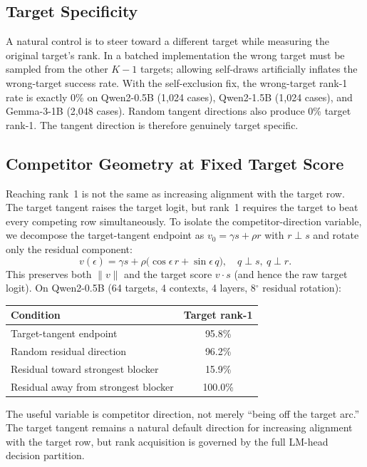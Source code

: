 \documentclass{article}
\begin{document}
\subsection{Target Specificity}

A natural control is to steer toward a different target while measuring the
original target's rank. In a batched implementation the wrong target must be
sampled from the other $K-1$ targets; allowing self-draws artificially inflates
the wrong-target success rate. With the self-exclusion fix, the wrong-target
rank-1 rate is exactly 0\% on Qwen2-0.5B (1,024 cases), Qwen2-1.5B (1,024
cases), and Gemma-3-1B (2,048 cases). Random tangent directions also produce 0\%
target rank-1. The tangent direction is therefore genuinely target specific.

\subsection{Competitor Geometry at Fixed Target Score}

Reaching rank~1 is not the same as increasing alignment with the target row.
The target tangent raises the target logit, but rank~1 requires the target to
beat every competing row simultaneously. To isolate the competitor-direction
variable, we decompose the target-tangent endpoint as $v_0 = \gamma s + \rho r$
with $r \perp s$ and rotate only the residual component:
\[
v(\epsilon) = \gamma s + \rho\bigl(\cos\epsilon\, r + \sin\epsilon\, q\bigr),
\quad q \perp s,\ q \perp r.
\]
This preserves both $\|v\|$ and the target score $v \cdot s$ (and hence the
raw target logit). On Qwen2-0.5B (64 targets, 4 contexts, 4 layers, 8$^\circ$
residual rotation):

\begin{center}
\begin{tabular}{lc}
\toprule
Condition & Target rank-1 \\
\midrule
Target-tangent endpoint & 95.8\% \\
Random residual direction & 96.2\% \\
Residual toward strongest blocker & 15.9\% \\
Residual away from strongest blocker & 100.0\% \\
\bottomrule
\end{tabular}
\end{center}

The useful variable is competitor direction, not merely ``being off the target
arc.'' The target tangent remains a natural default direction for increasing
alignment with the target row, but rank acquisition is governed by the full
LM-head decision partition.
\end{document}
